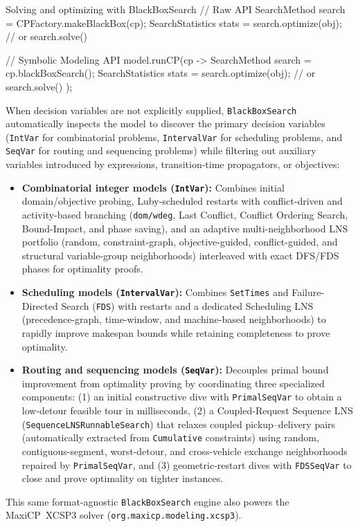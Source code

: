 \documentclass[11pt, a4paper]{scrartcl}
\newcommand{\maxicp}{\textsf{MaxiCP}}
\begin{document}
\begin{codebox}[label={lst:blackbox}]{Solving and optimizing with BlackBoxSearch}
// Raw API
SearchMethod search = CPFactory.makeBlackBox(cp);
SearchStatistics stats = search.optimize(obj); // or search.solve()

// Symbolic Modeling API
model.runCP(cp -> {
    SearchMethod search = cp.blackBoxSearch();
    SearchStatistics stats = search.optimize(obj); // or search.solve()
});
\end{codebox}

When decision variables are not explicitly supplied, \texttt{BlackBoxSearch} automatically inspects the model to discover the primary decision variables (\texttt{IntVar} for combinatorial problems, \texttt{IntervalVar} for scheduling problems, and \texttt{SeqVar} for routing and sequencing problems) while filtering out auxiliary variables introduced by expressions, transition-time propagators, or objectives:
\begin{itemize}
    \item \textbf{Combinatorial integer models (\texttt{IntVar}):} Combines initial domain/objective probing, Luby-scheduled restarts with conflict-driven and activity-based branching (\texttt{dom/wdeg}, Last Conflict, Conflict Ordering Search, Bound-Impact, and phase saving), and an adaptive multi-neighborhood LNS portfolio (random, constraint-graph, objective-guided, conflict-guided, and structural variable-group neighborhoods) interleaved with exact DFS/FDS phases for optimality proofs.
    \item \textbf{Scheduling models (\texttt{IntervalVar}):} Combines \texttt{SetTimes} and Failure-Directed Search (\texttt{FDS}) with restarts and a dedicated Scheduling LNS (precedence-graph, time-window, and machine-based neighborhoods) to rapidly improve makespan bounds while retaining completeness to prove optimality.
    \item \textbf{Routing and sequencing models (\texttt{SeqVar}):} Decouples primal bound improvement from optimality proving by coordinating three specialized components: (1) an initial constructive dive with \texttt{PrimalSeqVar} to obtain a low-detour feasible tour in milliseconds, (2) a Coupled-Request Sequence LNS (\texttt{SequenceLNSRunnableSearch}) that relaxes coupled pickup--delivery pairs (automatically extracted from \texttt{Cumulative} constraints) using random, contiguous-segment, worst-detour, and cross-vehicle exchange neighborhoods repaired by \texttt{PrimalSeqVar}, and (3) geometric-restart dives with \texttt{FDSSeqVar} to close and prove optimality on tighter instances.
\end{itemize}
This same format-agnostic \texttt{BlackBoxSearch} engine also powers the \maxicp\ XCSP3 solver (\texttt{org.maxicp.modeling.xcsp3}).
\end{document}
